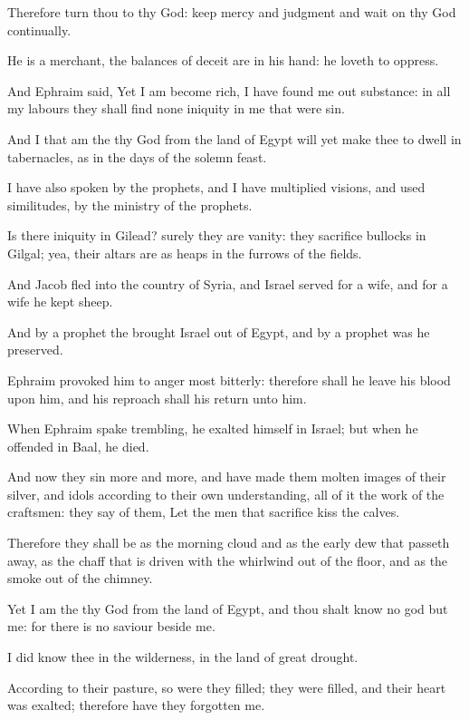 \Verse Therefore turn thou to thy God: keep mercy and judgment and wait on thy God continually.

\Verse He is a merchant, the balances of deceit are in his hand: he loveth to oppress.

\Verse And Ephraim said, Yet I am become rich, I have found me out substance: in all my labours they shall find none iniquity in me that were sin.

\Verse And I that am the \LORD thy God from the land of Egypt will yet make thee to dwell in tabernacles, as in the days of the solemn feast.

\Verse I have also spoken by the prophets, and I have multiplied visions, and used similitudes, by the ministry of the prophets.

\Verse Is there iniquity in Gilead? surely they are vanity: they sacrifice bullocks in Gilgal; yea, their altars are as heaps in the furrows of the fields.

\Verse And Jacob fled into the country of Syria, and Israel served for a wife, and for a wife he kept sheep.

\Verse And by a prophet the \LORD brought Israel out of Egypt, and by a prophet was he preserved.

\Verse Ephraim provoked him to anger most bitterly: therefore shall he leave his blood upon him, and his reproach shall his \LORD return unto him.


\Chapter
\Verse When Ephraim spake trembling, he exalted himself in Israel; but when he offended in Baal, he died.

\Verse And now they sin more and more, and have made them molten images of their silver, and idols according to their own understanding, all of it the work of the craftsmen: they say of them, Let the men that sacrifice kiss the calves.

\Verse Therefore they shall be as the morning cloud and as the early dew that passeth away, as the chaff that is driven with the whirlwind out of the floor, and as the smoke out of the chimney.

\Verse Yet I am the \LORD thy God from the land of Egypt, and thou shalt know no god but me: for there is no saviour beside me.

\Verse I did know thee in the wilderness, in the land of great drought.

\Verse According to their pasture, so were they filled; they were filled, and their heart was exalted; therefore have they forgotten me.

